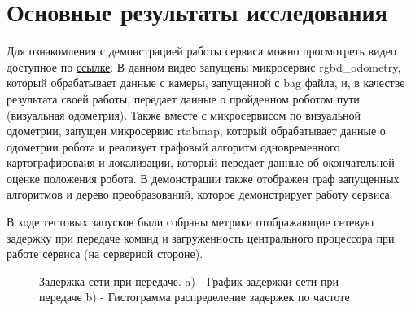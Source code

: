 \documentclass[a4paper, 14pt]{extreport}
\begin{document}
\section{Основные результаты исследования}
\par Для ознакомления с демонстрацией работы сервиса можно просмотреть видео
доступное по
 \href{https://rutube.ru/video/508c42fa971fc0d4260576602548bb51/}{ссылке}.
В данном видео запущены микросервис rgbd\_odometry, который обрабатывает 
данные с камеры, запущенной с bag файла, и, в качестве результата своей 
работы, передает данные о пройденном роботом пути (визуальная одометрия).
Также вместе с микросервисом по визуальной одометрии, запущен микросервис 
rtabmap, который обрабатывает данные о одометрии робота и реализует 
графовый алгоритм одновременного картографироваия и локализации, который 
передает данные об окончательной оценке положения робота. В демонстрации
также отображен граф запущенных алгоритмов и дерево преобразований, 
которое демонстрирует работу сервиса.
\par В ходе тестовых запусков были собраны метрики отображающие сетевую задержку 
при передаче команд и загруженность центрального процессора при работе
сервиса (на серверной стороне).
\begin{figure}[ht]
\begin{minipage}[h]{\linewidth}
\end{minipage}
\hfill
\begin{minipage}[h]{\linewidth}
\end{minipage}
\caption{Задержка сети при передаче. a) - График задержки сети при передаче b) - Гистограмма распределение задержек по частоте} 
\label{ris:image1}
\end{figure}
\end{document}
